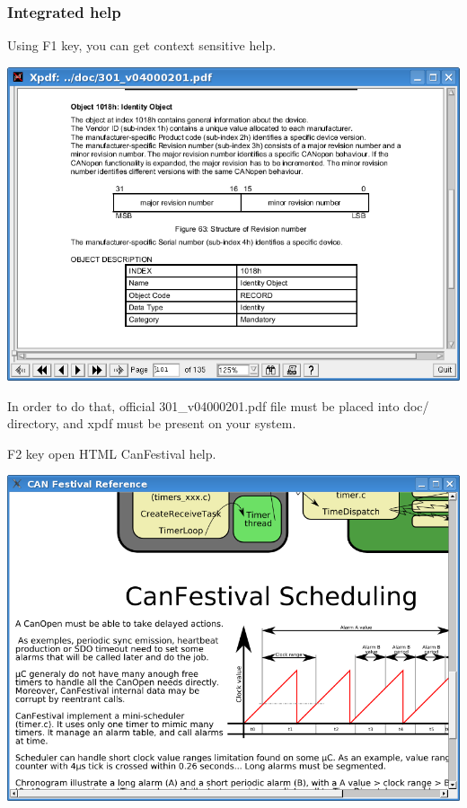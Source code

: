 \documentclass[12pt,twoside]{article}
\begin{document}
\subsubsection{Integrated help}
Using F1 key, you can get context sensitive help.\newline
 \begin{center}
   \includegraphics[width=15cm]{Pictures/10000201000002F30000020B23ED7F67.png}
\end{center}

In order to do that, official 301\_v04000201.pdf file must be placed
into doc/ directory, and xpdf must be present on your system.

F2 key open HTML CanFestival help.\newline
 \begin{center}
   \includegraphics[width=15cm]{Pictures/10000201000003440000025ACC3FD2F1.png}
\end{center}
\end{document}
